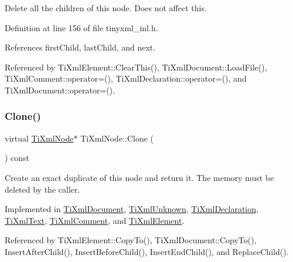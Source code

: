 Delete all the children of this node. Does not affect \textquotesingle{}this\textquotesingle{}. 



Definition at line 156 of file tinyxml\+\_\+inl.\+h.



References first\+Child, last\+Child, and next.



Referenced by Ti\+Xml\+Element\+::\+Clear\+This(), Ti\+Xml\+Document\+::\+Load\+File(), Ti\+Xml\+Comment\+::operator=(), Ti\+Xml\+Declaration\+::operator=(), and Ti\+Xml\+Document\+::operator=().

\hypertarget{class_ti_xml_node_a4508cc3a2d7a98e96a54cc09c37a78a4}{}\label{class_ti_xml_node_a4508cc3a2d7a98e96a54cc09c37a78a4} 
\subsubsection{\texorpdfstring{Clone()}{Clone()}}
{\footnotesize\ttfamily virtual \hyperlink{class_ti_xml_node}{Ti\+Xml\+Node}$\ast$ Ti\+Xml\+Node\+::\+Clone (\begin{DoxyParamCaption}{ }\end{DoxyParamCaption}) const\hspace{0.3cm}{\ttfamily [pure virtual]}}

Create an exact duplicate of this node and return it. The memory must be deleted by the caller. 

Implemented in \hyperlink{class_ti_xml_document_a46a4dda6c56eb106d46d4046ae1e5353}{Ti\+Xml\+Document}, \hyperlink{class_ti_xml_unknown_a3dea7689de5b1931fd6657992948fde0}{Ti\+Xml\+Unknown}, \hyperlink{class_ti_xml_declaration_a35dc1455f69b79e81cae28e186944610}{Ti\+Xml\+Declaration}, \hyperlink{class_ti_xml_text_a98a20d7a4f1c1478e25e34921be24bfe}{Ti\+Xml\+Text}, \hyperlink{class_ti_xml_comment_a1f9f06e2ed3f77875093436193b16c16}{Ti\+Xml\+Comment}, and \hyperlink{class_ti_xml_element_a810ea8fa40844c01334e5af2a26794cb}{Ti\+Xml\+Element}.



Referenced by Ti\+Xml\+Element\+::\+Copy\+To(), Ti\+Xml\+Document\+::\+Copy\+To(), Insert\+After\+Child(), Insert\+Before\+Child(), Insert\+End\+Child(), and Replace\+Child().

\hypertarget{class_ti_xml_node_aaadd5bb9c94f84c4472b649b95de4a0b}{}\label{class_ti_xml_node_aaadd5bb9c94f84c4472b649b95de4a0b} 
